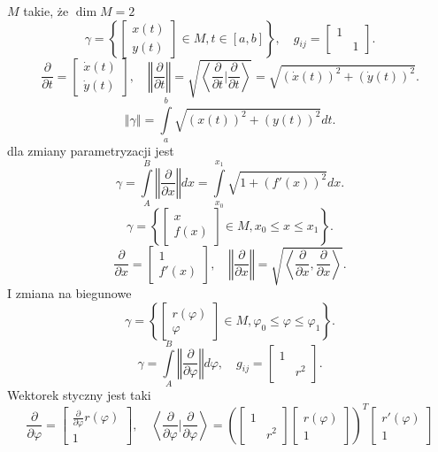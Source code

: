 \documentclass[../main.tex]{subfiles}
\begin{document}
\begin{przyklad}
$M$ takie, że $\dim M = 2$
 \[
     \gamma = \left\{ \begin{bmatrix} x(t)\\y(t) \end{bmatrix} \in M, t\in[a,b] \right\},\quad g_{ij} = \begin{bmatrix} 1&\\&1 \end{bmatrix}
.\]
\[
    \frac{\partial }{\partial t} = \begin{bmatrix} \dot{x}(t)\\ \dot{y}(t)\end{bmatrix},\quad \left\Vert \frac{\partial }{\partial t}  \right\Vert = \sqrt{\left<\frac{\partial }{\partial t} \Bigg| \frac{\partial }{\partial t}  \right>} = \sqrt{\left( \dot{x}(t) \right) ^2 + \left( \dot{y}(t) \right) ^2}
.\]
\[
    \left\Vert \gamma \right\Vert = \int\limits_a^b \sqrt{\left( x(t) \right) ^2 + \left( y(t) \right) ^2}dt
.\]
dla zmiany parametryzacji jest
\[
    \gamma = \int\limits_A^B \left\Vert \frac{\partial }{\partial x}  \right\Vert dx = \int\limits_{x_0}^{x_1}\sqrt{1 + \left( f'(x) \right) ^2} dx
.\]
\[
    \gamma = \left\{ \begin{bmatrix} x\\ f(x) \end{bmatrix} \in M, x_0 \le x \le x_1 \right\}
.\]
\[
    \frac{\partial }{\partial x} = \begin{bmatrix} 1\\ f'(x) \end{bmatrix},\quad \left\Vert \frac{\partial }{\partial x}  \right\Vert = \sqrt{\left<\frac{\partial }{\partial x} , \frac{\partial }{\partial x}  \right>}
.\]
I zmiana na biegunowe
\[
    \gamma = \left\{ \begin{bmatrix} r(\varphi)\\ \varphi \end{bmatrix} \in M, \varphi_0\le\varphi\le\varphi_1 \right\}
.\]
\[
    \gamma = \int\limits_A^B \left\Vert \frac{\partial }{\partial \varphi}  \right\Vert d\varphi,\quad g_{ij} = \begin{bmatrix} 1&\\&r^2 \end{bmatrix}
.\]
Wektorek styczny jest taki
\[
    \frac{\partial }{\partial \varphi}  = \begin{bmatrix} \frac{\partial }{\partial \varphi} r(\varphi)\\ 1 \end{bmatrix},\quad \left<\frac{\partial }{\partial \varphi} | \frac{\partial }{\partial \varphi}  \right> = \left( \begin{bmatrix} 1&\\&r^2 \end{bmatrix} \begin{bmatrix} r(\varphi)\\ 1 \end{bmatrix}  \right) ^T \begin{bmatrix} r'(\varphi) \\ 1 \end{bmatrix}
\]
\end{przyklad}
\end{document}
